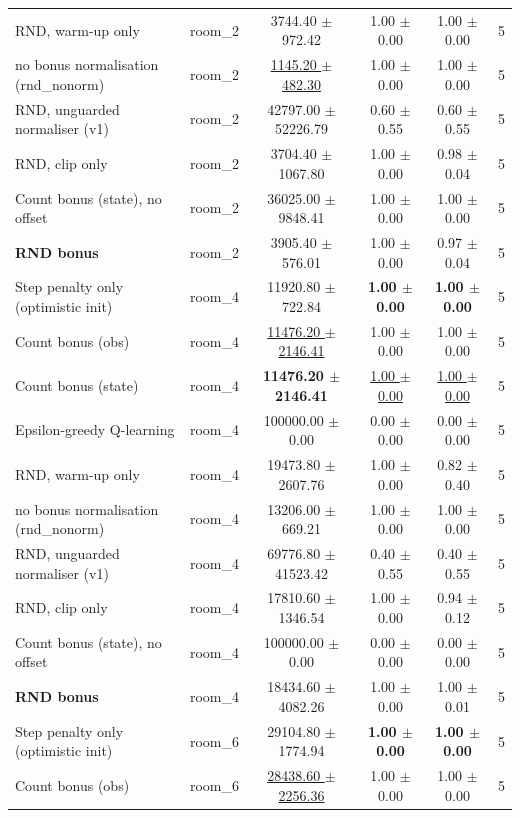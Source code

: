 \begin{tabular}{llcccc}
RND, warm-up only & room\_2 & 3744.40 $\pm$ 972.42 & 1.00 $\pm$ 0.00 & 1.00 $\pm$ 0.00 & 5 \\
no bonus normalisation (rnd\_nonorm) & room\_2 & \underline{1145.20 $\pm$ 482.30} & 1.00 $\pm$ 0.00 & 1.00 $\pm$ 0.00 & 5 \\
RND, unguarded normaliser (v1) & room\_2 & 42797.00 $\pm$ 52226.79 & 0.60 $\pm$ 0.55 & 0.60 $\pm$ 0.55 & 5 \\
RND, clip only & room\_2 & 3704.40 $\pm$ 1067.80 & 1.00 $\pm$ 0.00 & 0.98 $\pm$ 0.04 & 5 \\
Count bonus (state), no offset & room\_2 & 36025.00 $\pm$ 9848.41 & 1.00 $\pm$ 0.00 & 1.00 $\pm$ 0.00 & 5 \\
\textbf{RND bonus} & room\_2 & 3905.40 $\pm$ 576.01 & 1.00 $\pm$ 0.00 & 0.97 $\pm$ 0.04 & 5 \\
\midrule
Step penalty only (optimistic init) & room\_4 & 11920.80 $\pm$ 722.84 & \textbf{1.00 $\pm$ 0.00} & \textbf{1.00 $\pm$ 0.00} & 5 \\
Count bonus (obs) & room\_4 & \underline{11476.20 $\pm$ 2146.41} & 1.00 $\pm$ 0.00 & 1.00 $\pm$ 0.00 & 5 \\
Count bonus (state) & room\_4 & \textbf{11476.20 $\pm$ 2146.41} & \underline{1.00 $\pm$ 0.00} & \underline{1.00 $\pm$ 0.00} & 5 \\
Epsilon-greedy Q-learning & room\_4 & 100000.00 $\pm$ 0.00 & 0.00 $\pm$ 0.00 & 0.00 $\pm$ 0.00 & 5 \\
RND, warm-up only & room\_4 & 19473.80 $\pm$ 2607.76 & 1.00 $\pm$ 0.00 & 0.82 $\pm$ 0.40 & 5 \\
no bonus normalisation (rnd\_nonorm) & room\_4 & 13206.00 $\pm$ 669.21 & 1.00 $\pm$ 0.00 & 1.00 $\pm$ 0.00 & 5 \\
RND, unguarded normaliser (v1) & room\_4 & 69776.80 $\pm$ 41523.42 & 0.40 $\pm$ 0.55 & 0.40 $\pm$ 0.55 & 5 \\
RND, clip only & room\_4 & 17810.60 $\pm$ 1346.54 & 1.00 $\pm$ 0.00 & 0.94 $\pm$ 0.12 & 5 \\
Count bonus (state), no offset & room\_4 & 100000.00 $\pm$ 0.00 & 0.00 $\pm$ 0.00 & 0.00 $\pm$ 0.00 & 5 \\
\textbf{RND bonus} & room\_4 & 18434.60 $\pm$ 4082.26 & 1.00 $\pm$ 0.00 & 1.00 $\pm$ 0.01 & 5 \\
\midrule
Step penalty only (optimistic init) & room\_6 & 29104.80 $\pm$ 1774.94 & \textbf{1.00 $\pm$ 0.00} & \textbf{1.00 $\pm$ 0.00} & 5 \\
Count bonus (obs) & room\_6 & \underline{28438.60 $\pm$ 2256.36} & 1.00 $\pm$ 0.00 & 1.00 $\pm$ 0.00 & 5 \\

\end{tabular}
